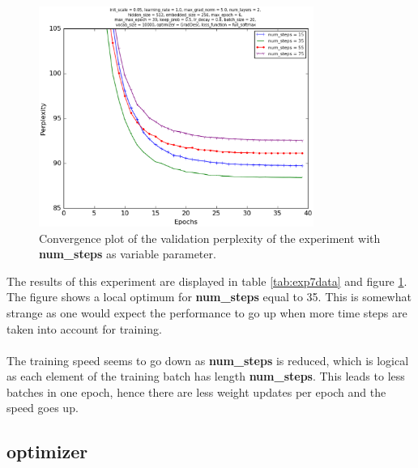 \documentclass[10pt,a4paper,titlepage]{article}
\begin{document}
\begin{figure}[H]
	\begin{center}
		\includegraphics[width=0.80\textwidth]{Figures/numstepsperf.eps}
		\caption{Convergence plot of the validation perplexity of the experiment with \textbf{num\_steps} as variable parameter. }
		\label{fig:exp7perf}
	\end{center}	
\end{figure}

The results of this experiment are displayed in table \ref{tab:exp7data} and figure \ref{fig:exp7perf}. The figure shows a local optimum for \textbf{num\_steps} equal to 35. This is somewhat strange as one would expect the performance to go up when more time steps are taken into account for training.\\
\\
The training speed seems to go down as \textbf{num\_steps} is reduced, which is logical as each element of the training batch has length \textbf{num\_steps}. This leads to less batches in one epoch, hence there are less weight updates per epoch and the speed goes up.

\newpage

\subsection{optimizer}
\end{document}
